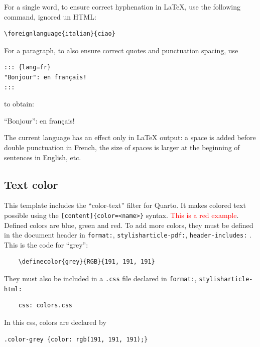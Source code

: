 \documentclass[
  french,
  british,
  11pt,
]{stylisharticle}
\begin{document}
For a single word, to ensure correct hyphenation in LaTeX, use the
following command, ignored un HTML:

\begin{verbatim}
\foreignlanguage{italian}{ciao}
\end{verbatim}

For a paragraph, to also ensure correct quotes and punctuation spacing,
use

\begin{verbatim}
::: {lang=fr}
"Bonjour": en français!
:::
\end{verbatim}

to obtain:

\begin{otherlanguage}{french}

\enquote{Bonjour}: en français!

\end{otherlanguage}

The current language has an effect only in LaTeX output: a space is
added before double punctuation in French, the size of spaces is larger
at the beginning of sentences in English, etc.

\subsection{Text color}\label{text-color}

This template includes the \enquote{color-text} filter for Quarto. It
makes colored text possible using the
\texttt{{[}content{]}\{color=\textless{}name\textgreater{}\}} syntax.
\textcolor{red}{This is a red example}. Defined colors are blue, green
and red. To add more colors, they must be defined in the document header
in \texttt{format:}, \texttt{stylisharticle-pdf:},
\texttt{header-includes:} . This is the code for \enquote{grey}:

\begin{verbatim}
    \definecolor{grey}{RGB}{191, 191, 191}
\end{verbatim}

They must also be included in a \texttt{.css} file declared in
\texttt{format:}, \texttt{stylisharticle-html:}

\begin{verbatim}
    css: colors.css
\end{verbatim}

In this css, colors are declared by

\begin{verbatim}
.color-grey {color: rgb(191, 191, 191);}
\end{verbatim}
\end{document}
